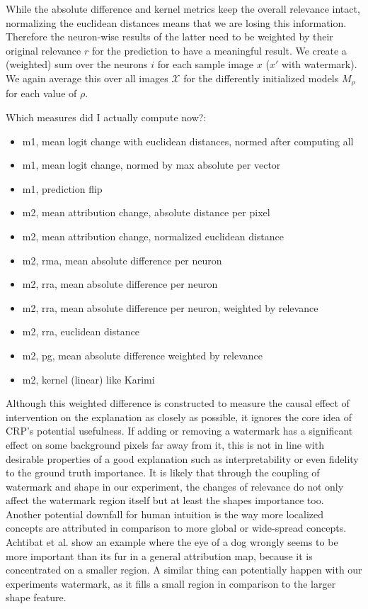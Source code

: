 While the absolute difference and kernel metrics keep the overall relevance intact, normalizing the euclidean distances means that we are losing this information. Therefore the neuron-wise results of the latter need to be weighted by their original relevance $r$ for the prediction to have a meaningful result. 
We create a (weighted) sum over the neurons $i$ for each sample image $x$ ($x'$ with watermark). 
We again average this over all images $\mathcal{X}$ for the differently initialized models $M_\rho$ for each value of $\rho$.

Which measures did I actually compute now?:
\begin{itemize}
    \item m1, mean logit change with euclidean distances, normed after computing all
    \item m1, mean logit change, normed by max absolute per vector
    \item m1, prediction flip
    \item m2, mean attribution change, absolute distance per pixel
    \item m2, mean attribution change, normalized euclidean distance
    \item m2, rma, mean absolute difference per neuron
    \item m2, rra, mean absolute difference per neuron
    \item m2, rra, mean absolute difference per neuron, weighted by relevance
    \item m2, rra, euclidean distance
    \item m2, pg, mean absolute difference weighted by relevance
    \item m2, kernel (linear) like Karimi
\end{itemize}

Although this weighted difference is constructed to measure the causal effect of intervention on the explanation as closely as possible, it ignores the core idea of CRP's potential usefulness. If adding or removing a watermark has a significant effect on some background pixels far away from it, this is not in line with desirable properties of a good explanation such as interpretability or even fidelity to the ground truth importance. It is likely that through the coupling of watermark and shape in our experiment, the changes of relevance do not only affect the watermark region itself but at least the shapes importance too. 
Another potential downfall for human intuition is the way more localized concepts are attributed in comparison to more global or wide-spread concepts. Achtibat et al. \cite{Achtibat2022} show an example where the eye of a dog wrongly seems to be more important than its fur in a general attribution map, because it is concentrated on a smaller region. A similar thing can potentially happen with our experiments watermark, as it fills a small region in comparison to the larger shape feature. 

